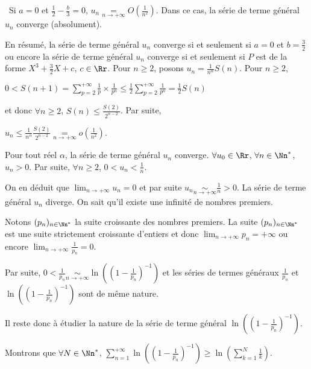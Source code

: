 {{\textbullet~Si $a = 0$ et $\frac{1}{2}-\frac{b}{3}= 0$, $u_n\underset{n\rightarrow+\infty}{=}O\left(\frac{1}{n^2}\right)$. Dans ce cas, la série de terme général $u_n$ converge (absolument).

En résumé, la série de terme général $u_n$ converge si et seulement si $a = 0$ et  $b=\frac{3}{2}$ ou encore la série de terme général $u_n$ converge si et seulement si $P$ est de la forme $X^3+\frac{3}{2}X+c$, $c\in\Rr$.
Pour $n\geqslant2$, posons $u_n=\frac{1}{n^\alpha}S(n)$. Pour $n\geqslant2$,

\begin{center}
$0<S(n+1)=\sum_{p=2}^{+\infty}\frac{1}{p}\times\frac{1}{p^n}\leqslant\frac{1}{2}\sum_{p=2}^{+\infty}\frac{1}{p^n}=\frac{1}{2}S(n)$
\end{center}

et donc $\forall n\geqslant2$, $S(n)\leqslant\frac{S(2)}{2^{n-2}}$. Par suite,

\begin{center}
$u_n\leqslant\frac{1}{n^\alpha}\frac{S(2)}{2^{n-2}}\underset{n\rightarrow+\infty}{=}o\left(\frac{1}{n^2}\right)$.
\end{center}

Pour tout réel $\alpha$, la série de terme général $u_n$ converge.
$\forall u_0\in\Rr$, $\forall n\in\Nn^*$, $u_n > 0$. Par suite, $\forall n\geqslant 2$, $0< u_n<\frac{1}{n}$.

On en déduit que $\lim_{n \rightarrow +\infty}u_n=0$ et par suite $u_n\underset{n\rightarrow+\infty}{\sim}\frac{1}{n}>0$. La série de terme général $u_n$ diverge.
On sait qu'il existe une infinité de nombres premiers.

Notons $(p_n)_{n\in\Nn^*}$ la suite croissante des nombres premiers. La suite $(p_n)_{n\in\Nn^*}$ est une suite strictement croissante d'entiers et donc $\lim_{n \rightarrow +\infty}p_n= +\infty$ ou encore $\lim_{n \rightarrow +\infty}\frac{1}{p_n}=0$.

Par suite, $0<\frac{1}{p_n}\underset{n\rightarrow+\infty}{\sim}\ln\left(\left(1-\frac{1}{p_n}\right)^{-1}\right)$ et les séries de termes généraux $\frac{1}{p_n}$ et $\ln\left(\left(1-\frac{1}{p_n}\right)^{-1}\right)$ sont de même nature.

Il reste donc à étudier la nature de la série de terme général $\ln\left(\left(1-\frac{1}{p_n}\right)^{-1}\right)$.

Montrons que $\forall N\in\Nn^*$,  $\sum_{n=1}^{+\infty}\ln\left(\left(1-\frac{1}{p_n}\right)^{-1}\right)\geqslant\ln\left(\sum_{k=1}^{N}\frac{1}{k}\right)$.

}}
